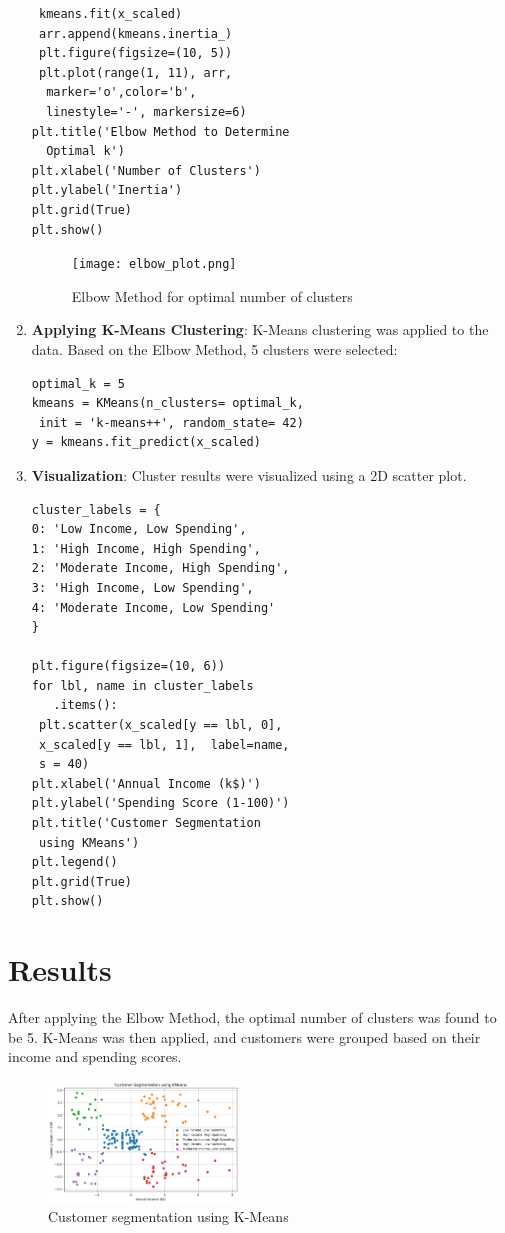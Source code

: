 \documentclass[conference]{IEEEtran}
\begin{document}
\begin{enumerate}
\begin{verbatim}
 kmeans.fit(x_scaled)
 arr.append(kmeans.inertia_)
 plt.figure(figsize=(10, 5))
 plt.plot(range(1, 11), arr,
  marker='o',color='b', 
  linestyle='-', markersize=6)
plt.title('Elbow Method to Determine 
  Optimal k')
plt.xlabel('Number of Clusters')
plt.ylabel('Inertia')
plt.grid(True)
plt.show()
\end{verbatim}
        
        \begin{figure}[h]
            \centering
            \texttt{[image: elbow\_plot.png]}
            \caption{Elbow Method for optimal number of clusters}
            \label{fig:elbow}
        \end{figure}
    \item \textbf{Applying K-Means Clustering}: K-Means clustering was applied to the data. Based on the Elbow Method, 5 clusters were selected:
\begin{verbatim}
optimal_k = 5
kmeans = KMeans(n_clusters= optimal_k,
 init = 'k-means++', random_state= 42)
y = kmeans.fit_predict(x_scaled)
\end{verbatim}

    \item \textbf{Visualization}: Cluster results were visualized using a 2D scatter plot.
\begin{verbatim}
cluster_labels = {
0: 'Low Income, Low Spending',
1: 'High Income, High Spending',
2: 'Moderate Income, High Spending',
3: 'High Income, Low Spending',
4: 'Moderate Income, Low Spending'
}

plt.figure(figsize=(10, 6))
for lbl, name in cluster_labels
   .items():
 plt.scatter(x_scaled[y == lbl, 0], 
 x_scaled[y == lbl, 1],  label=name,
 s = 40)
plt.xlabel('Annual Income (k$)')
plt.ylabel('Spending Score (1-100)')
plt.title('Customer Segmentation
 using KMeans')
plt.legend()
plt.grid(True)
plt.show()
\end{verbatim}
\end{enumerate}

\section{Results}
After applying the Elbow Method, the optimal number of clusters was found to be 5. K-Means was then applied, and customers were grouped based on their income and spending scores.
\begin{figure}[h]
    \centering
    \includegraphics[width=0.45\textwidth]{customer_segment.png}
    \caption{Customer segmentation using K-Means}
    \label{fig:clusters}
\end{figure}
\end{document}
